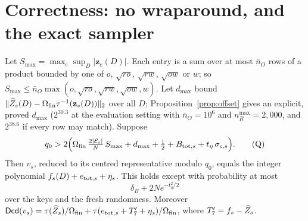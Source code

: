 \section{Correctness: no wraparound, and the exact sampler}
\label{sec:corr}

\begin{proposition}\label{prop:wrap}
Let $S_{\max}=\max_e\sup_D|\mathbf z_e(D)|$. Each entry is a sum over at most $\bar n_O$ rows of a product bounded by one of $o$, $\sqrt{ro}$, $\sqrt{rw}$, $\sqrt{ow}$ or $w$; so $S_{\max}\le\bar n_O\max(o,\sqrt{ro},\sqrt{rw},\sqrt{ow},w)$. Let $d_{\max}$ bound $\lVert \widehat Z_s(D)-\Omega_{\mathrm{fin}}\tau^{-1}(\mathbf z_s(D))\rVert_2$ over all $D$; Proposition~\ref{prop:offset} gives an explicit, proved $d_{\max}$ ($2^{30.3}$ at the evaluation setting with $\bar n_O=10^6$ and $n_R^{\max}=2{,}000$, and $2^{38.6}$ if every row may match). Suppose
\[
  q_0>2\Bigl(\Omega_{\mathrm{fin}}\,\tfrac{2|\mathcal E_s|}{N}\,S_{\max}+d_{\max}+\tfrac12+B_{\mathrm{tot},s}+t_\eta\,\sigma_{c,s}\Bigr).
  \tag{Q}
\]
Then $v_s$, reduced to its centred representative modulo $q_0$, equals the integer polynomial $f_s(D)+e_{\mathrm{tot},s}+\eta_s$. This holds except with probability at most
\[
  \delta_B+2Ne^{-t_\eta^2/2}
\]
over the keys and the fresh randomness. Moreover $\mathsf{Dcd}(v_s)=\tau(\widehat Z_s)/\Omega_{\mathrm{fin}}+\tau(e_{\mathrm{tot},s}+T'_7+\eta_s)/\Omega_{\mathrm{fin}}$, where $T'_7=f_s-\widehat Z_s$.
\end{proposition}
